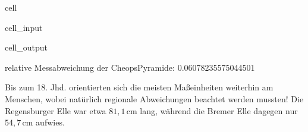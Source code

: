\documentclass[letterpaper,10pt,english]{jupyterBook}
\begin{document}
\begin{sphinxuseclass}{cell}\begin{sphinxVerbatimInput}

\begin{sphinxuseclass}{cell_input}
\begin{sphinxVerbatim}[commandchars=\\\{\}]
     
            
    
  
\end{sphinxVerbatim}

\end{sphinxuseclass}\end{sphinxVerbatimInput}
\begin{sphinxVerbatimOutput}

\begin{sphinxuseclass}{cell_output}
\begin{sphinxVerbatim}[commandchars=\\\{\}]
relative Messabweichung der Cheops\PYGZhy{}Pyramide:  0.06078235575044501 \PYGZpc{}
\end{sphinxVerbatim}

\end{sphinxuseclass}\end{sphinxVerbatimOutput}

\end{sphinxuseclass}
\sphinxAtStartPar
{}

\sphinxAtStartPar
Bis zum 18. Jhd.  orientierten sich die meisten Maßeinheiten weiterhin am Menschen, wobei natürlich regionale Abweichungen beachtet werden mussten! Die Regensburger Elle war etwa \(81,1\,\mathrm{cm}\) lang, während die Bremer Elle dagegen nur \(54,7\,\mathrm{cm}\) aufwies.
\end{document}
